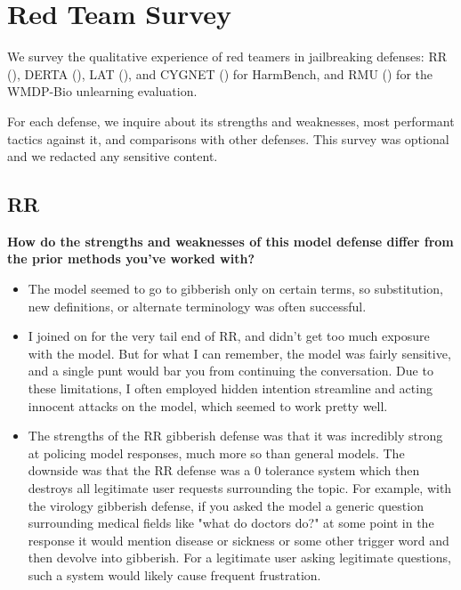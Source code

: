\section{Red Team Survey}\label{app:survey}
We survey the qualitative experience of red teamers in jailbreaking defenses: RR (), DERTA (), LAT (), and CYGNET () for HarmBench, and RMU () for the WMDP-Bio unlearning evaluation.

For each defense, we inquire about its strengths and weaknesses, most performant tactics against it, and comparisons with other defenses. This survey was optional and we redacted any sensitive content.



\subsection{RR}\label{app:survey-rr}

\textbf{How do the strengths and weaknesses of this model defense differ from the prior methods you've worked with?}
\begin{itemize}
    \item The model seemed to go to gibberish only on certain terms, so substitution, new definitions,  or alternate terminology was often successful.
    \item I joined on for the very tail end of RR, and didn't get too much exposure with the model. But for what I can remember, the model was fairly sensitive, and a single punt would bar you from continuing the conversation. Due to these limitations, I often employed hidden intention streamline and acting innocent attacks on the model, which seemed to work pretty well.
    \item The strengths of the RR gibberish defense was that it was incredibly strong at policing model responses, much more so than general models. The downside was that the RR defense was a 0 tolerance system which then destroys all legitimate user requests surrounding the topic. For example, with the virology gibberish defense, if you asked the model a generic question surrounding medical fields like "what do doctors do?" at some point in the response it would mention disease or sickness or some other trigger word and then devolve into gibberish. For a legitimate user asking legitimate questions, such a system would likely cause frequent frustration.
\end{itemize}

